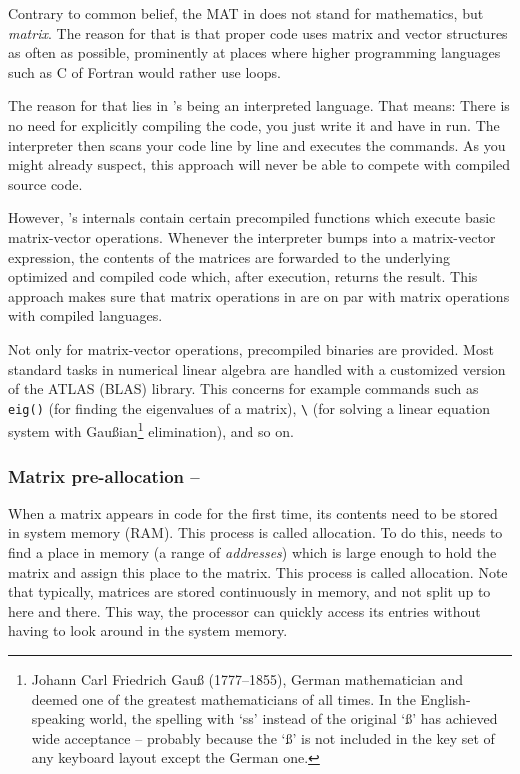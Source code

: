 Contrary to common belief, the MAT in \matlab{} does not stand for mathematics,
but \emph{matrix}. The reason for that is that proper \matlab{} code uses
matrix and vector structures as often as possible, prominently at places where
higher programming languages such as C of Fortran would rather use loops.

The reason for that lies in \matlab{}'s being an interpreted language. That
means: There is no need for explicitly compiling the code, you just write it
and have in run. The \matlab{} interpreter then scans your code line by line
and executes the commands. As you might already suspect, this approach will
never be able to compete with compiled source code.

However, \matlab{}'s internals contain certain precompiled functions which
execute basic matrix-vector operations. Whenever the \matlab{} interpreter
bumps into a matrix-vector expression, the contents of the matrices are
forwarded to the underlying optimized and compiled code which, after
execution, returns the result. This approach makes sure that matrix operations
in \matlab{} are on par with matrix operations with compiled languages.

\begin{remark}
Not only for matrix-vector operations, precompiled binaries are provided. Most
standard tasks in numerical linear algebra are handled with a customized
version of the ATLAS (BLAS) library. This concerns for example commands such
as \lstinline!eig()! (for finding the eigenvalues of a matrix), \lstinline!\!
(for solving a linear equation system with Gau{\ss}ian\footnote{Johann Carl
Friedrich Gau{\ss} (1777--1855), German mathematician and deemed one of the
greatest mathematicians of all times. In the English-speaking world, the
spelling with `ss' instead of the original `\ss' has achieved wide acceptance
-- probably because the `\ss' is not included in the key set of any keyboard
layout except the German one.} elimination), and so on.
\end{remark}

\subsubsection{Matrix pre-allocation -- \fastsymbol\fastsymbol\fastsymbol\fastsymbol\fastsymbol}

When a matrix appears in \matlab{} code for the first time, its contents need
to be stored in system memory (RAM). This process is called allocation. To do
this, \matlab{} needs to find a place in memory (a range of \emph{addresses})
which is large enough to hold the matrix and assign this place to the matrix.
This process is called allocation. Note that typically, matrices are stored
continuously in memory, and not split up to here and there. This way, the
processor can quickly access its entries without having to look around in the
system memory.

